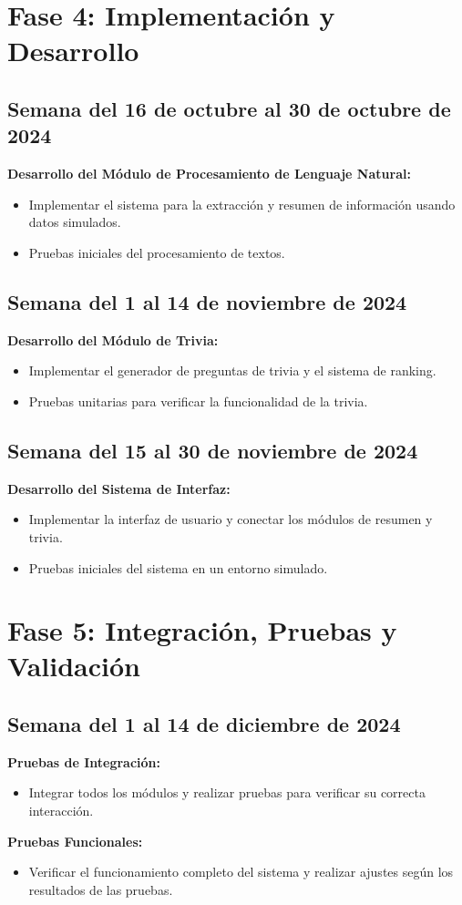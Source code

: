 \documentclass{report}
\begin{document}
    \section*{Fase 4: Implementación y Desarrollo}
    \subsection*{Semana del 16 de octubre al 30 de octubre de 2024}
    \textbf{Desarrollo del Módulo de Procesamiento de Lenguaje Natural:}
    \begin{itemize}
        \item Implementar el sistema para la extracción y resumen de información usando datos simulados.
        \item Pruebas iniciales del procesamiento de textos.
    \end{itemize}

    \subsection*{Semana del 1 al 14 de noviembre de 2024}
    \textbf{Desarrollo del Módulo de Trivia:}
    \begin{itemize}
        \item Implementar el generador de preguntas de trivia y el sistema de ranking.
        \item Pruebas unitarias para verificar la funcionalidad de la trivia.
    \end{itemize}

    \subsection*{Semana del 15 al 30 de noviembre de 2024}
    \textbf{Desarrollo del Sistema de Interfaz:}
    \begin{itemize}
        \item Implementar la interfaz de usuario y conectar los módulos de resumen y trivia.
        \item Pruebas iniciales del sistema en un entorno simulado.
    \end{itemize}

    \section*{Fase 5: Integración, Pruebas y Validación}
    \subsection*{Semana del 1 al 14 de diciembre de 2024}
    \textbf{Pruebas de Integración:}
    \begin{itemize}
        \item Integrar todos los módulos y realizar pruebas para verificar su correcta interacción.
    \end{itemize}
    \textbf{Pruebas Funcionales:}
    \begin{itemize}
        \item Verificar el funcionamiento completo del sistema y realizar ajustes según los resultados de las pruebas.
    \end{itemize}
\end{document}
